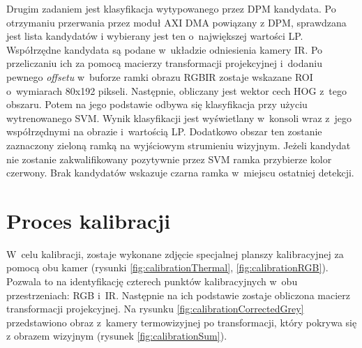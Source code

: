 Drugim zadaniem jest klasyfikacja wytypowanego przez DPM kandydata. 
Po otrzymaniu przerwania przez moduł AXI DMA powiązany z DPM, sprawdzana jest lista kandydatów i wybierany jest ten o~największej wartości LP. 
Współrzędne kandydata są podane w~układzie odniesienia kamery IR. 
Po przeliczaniu ich za pomocą macierzy transformacji projekcyjnej i~dodaniu pewnego \textit{offsetu} w~buforze ramki obrazu RGBIR zostaje wskazane ROI o~wymiarach 80x192 pikseli. 
Następnie, obliczany jest wektor cech HOG z~tego obszaru. 
Potem na jego podstawie odbywa się klasyfikacja przy użyciu wytrenowanego SVM. 
Wynik klasyfikacji jest wyświetlany w~konsoli wraz z~jego współrzędnymi na obrazie i~wartością LP. 
Dodatkowo obszar ten zostanie zaznaczony zieloną ramką na wyjściowym strumieniu wizyjnym. 
Jeżeli kandydat nie zostanie zakwalifikowany pozytywnie przez SVM ramka przybierze kolor czerwony. 
Brak kandydatów wskazuje czarna ramka w~miejscu ostatniej detekcji.

\section{Proces kalibracji}
W~celu kalibracji, zostaje wykonane zdjęcie specjalnej planszy kalibracyjnej za pomocą obu kamer (rysunki \ref{fig:calibrationThermal}, \ref{fig:calibrationRGB}). 
Pozwala to na identyfikację czterech punktów kalibracyjnych w~obu przestrzeniach: RGB i~IR. 
Następnie na ich podstawie zostaje obliczona macierz transformacji projekcyjnej. 
Na rysunku \ref{fig:calibrationCorrectedGrey} przedstawiono obraz z~kamery termowizyjnej po transformacji, który pokrywa się z obrazem wizyjnym (rysunek \ref{fig:calibrationSum}).


